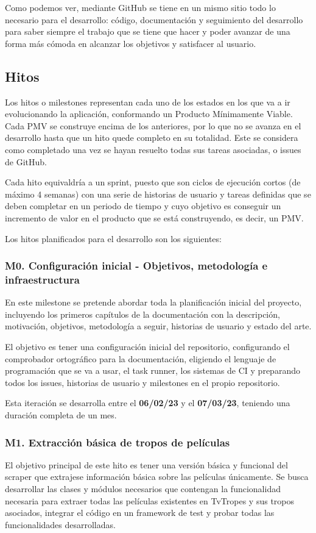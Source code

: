 Como podemos ver, mediante GitHub se tiene en un mismo sitio todo lo necesario para el desarrollo: código, documentación y seguimiento del desarrollo para saber siempre el trabajo que se tiene que hacer y poder avanzar de una forma más cómoda en alcanzar los objetivos y satisfacer al usuario. 

\subsection{Hitos}
Los hitos o milestones representan cada uno de los estados en los que va a ir evolucionando la aplicación, conformando un Producto Mínimamente Viable. Cada PMV se construye encima de los anteriores, por lo que no se avanza en el desarrollo hasta que un hito quede completo en su totalidad. Este se considera como completado una vez se hayan resuelto todas sus tareas asociadas, o issues de GitHub. 

Cada hito equivaldría a un sprint, puesto que son ciclos de ejecución cortos (de máximo 4 semanas) con una serie de historias de usuario y tareas definidas que se deben completar en un periodo de tiempo y cuyo objetivo es conseguir un incremento de valor en el producto que se está construyendo, es decir, un PMV.

Los hitos planificados para el desarrollo son los siguientes:

\subsubsection{M0. Configuración inicial - Objetivos, metodología e infraestructura}
En este milestone se pretende abordar toda la planificación inicial del proyecto, incluyendo los primeros capítulos de la documentación con la descripción, motivación, objetivos, metodología a seguir, historias de usuario y estado del arte.

El objetivo es tener una configuración inicial del repositorio, configurando el comprobador ortográfico para la documentación, eligiendo el lenguaje de programación que se va a usar, el task runner, los sistemas de CI y preparando todos los issues, historias de usuario y milestones en el propio repositorio.

Esta iteración se desarrolla entre el \textbf{06/02/23} y el \textbf{07/03/23}, teniendo una duración completa de un mes.
\subsubsection{M1. Extracción básica de tropos de películas}
El objetivo principal de este hito es tener una versión básica y funcional del scraper que extrajese información básica sobre las películas únicamente. Se busca desarrollar las clases y módulos necesarios que contengan la funcionalidad necesaria para extraer todas las películas existentes en TvTropes y sus tropos asociados, integrar el código en un framework de test y probar todas las funcionalidades desarrolladas.

